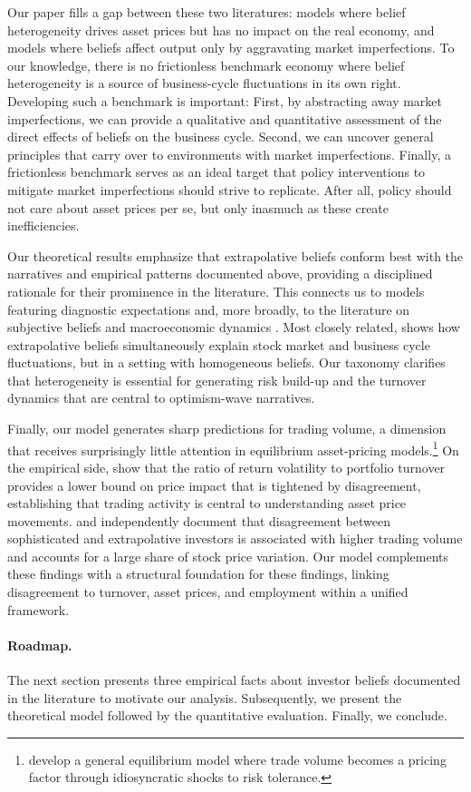 Our paper fills a gap between these two literatures: models where belief heterogeneity drives asset prices but has no impact on the real economy, and models where beliefs affect output only by aggravating market imperfections. To our knowledge, there is no frictionless benchmark economy where belief heterogeneity is a source of business-cycle fluctuations in its own right. Developing such a benchmark is important: First, by abstracting away market imperfections, we can provide a qualitative and quantitative assessment of the direct effects of beliefs on the business cycle. Second, we can uncover general principles that carry over to environments with market imperfections. Finally, a frictionless benchmark serves as an ideal target that policy interventions to mitigate market imperfections should strive to replicate. After all, policy should not care about asset prices per se, but only inasmuch as these create inefficiencies.

Our theoretical results emphasize that extrapolative beliefs conform best with the narratives and empirical patterns documented above, providing a disciplined rationale for their prominence in the literature. This connects us to models featuring diagnostic expectations \citep{GS10, bianchi2024diagnostic} and, more broadly, to the literature on subjective beliefs and macroeconomic dynamics \citep[e.g.,][]{EP11, ACD18, BGS18, BBH19}. Most closely related, \cite{AM19} shows how extrapolative beliefs simultaneously explain stock market and business cycle fluctuations, but in a setting with homogeneous beliefs. Our taxonomy clarifies that heterogeneity is essential for generating risk build-up and the turnover dynamics that are central to optimism-wave narratives.

Finally, our model generates sharp predictions for trading volume, a dimension that receives surprisingly little attention in equilibrium asset-pricing models.\footnote{\citet{AlvarezAtkeson2018} develop a general equilibrium model where trade volume becomes a pricing factor through idiosyncratic shocks to risk tolerance.} On the empirical side, \citet{vanderBeck2025} show that the ratio of return volatility to portfolio turnover provides a lower bound on price impact that is tightened by disagreement, establishing that trading activity is central to understanding asset price movements. \citet{ThesmarVerner2025} and \citet{McCarthyHillenbrand2025} independently document that disagreement between sophisticated and extrapolative investors is associated with higher trading volume and accounts for a large share of stock price variation. Our model complements these findings with a structural foundation for these findings, linking disagreement to turnover, asset prices, and employment within a unified framework.

\paragraph{Roadmap.} The next section presents three empirical facts about investor beliefs documented in the literature to motivate our analysis. Subsequently, we present the theoretical model followed by the quantitative evaluation. Finally, we conclude.